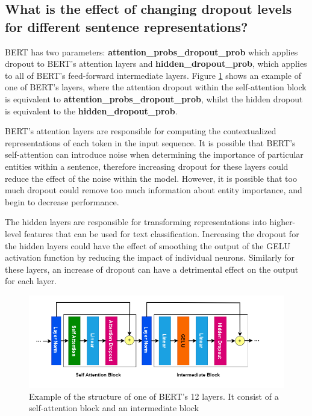 \documentclass{l4proj}
\begin{document}
\subsection{What is the effect of changing dropout levels for different sentence representations?}

BERT has two parameters: \textbf{attention\_probs\_dropout\_prob} which applies dropout to BERT's attention layers and \textbf{hidden\_dropout\_prob}, which applies to all of BERT's feed-forward intermediate layers. Figure \ref{fig:Drop} shows an example of one of BERT's layers, where the attention dropout within the self-attention block is equivalent to \textbf{attention\_probs\_dropout\_prob}, whilst the hidden dropout is equivalent to the \textbf{hidden\_dropout\_prob}. 

BERT's attention layers are responsible for computing the contextualized representations of each token in the input sequence. It is possible that BERT's self-attention can introduce noise when determining the importance of particular entities within a sentence, therefore increasing dropout for these layers could reduce the effect of the noise within the model. However, it is possible that too much dropout could remove too much information about entity importance, and begin to decrease performance. 

The hidden layers are responsible for transforming representations into higher-level features that can be used for text classification. Increasing the dropout for the hidden layers could have the effect of smoothing the output of the GELU activation function by reducing the impact of individual neurons. Similarly for these layers, an increase of dropout can have a detrimental effect on the output for each layer.

\begin{figure}[htb]
    \centering
    \includegraphics[width=16cm]{images/Drop.png}
  \caption{Example of the structure of one of BERT's 12 layers. It consist of a self-attention block and an intermediate block}
  \label{fig:Drop}
\end{figure}
\end{document}
